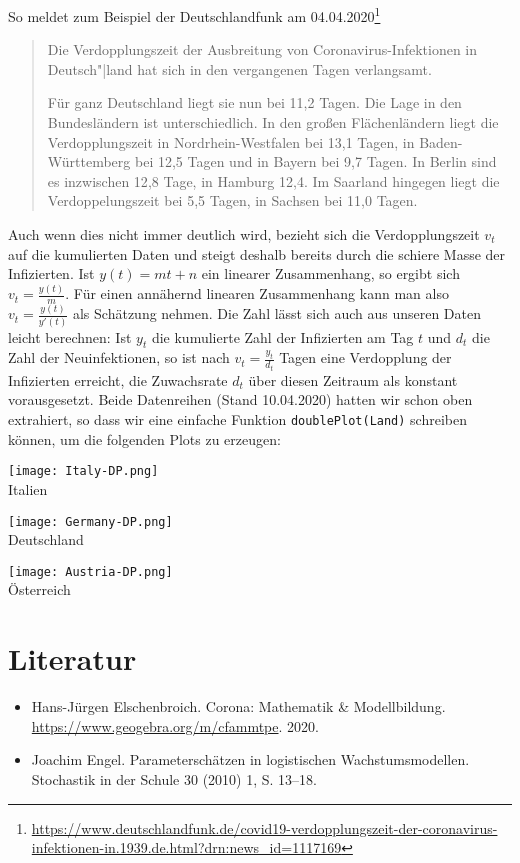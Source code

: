 \documentclass[a4paper,11pt]{article}
\begin{document}
So meldet zum Beispiel der Deutschlandfunk am 04.04.2020\footnote{\raggedright
  \url{https://www.deutschlandfunk.de/covid19-verdopplungszeit-der-coronavirus-infektionen-in.1939.de.html?drn:news_id=1117169}}
\begin{quote}
  Die Verdopplungszeit der Ausbreitung von Coronavirus-Infektionen in
  Deutsch"|land hat sich in den vergangenen Tagen verlangsamt.

  Für ganz Deutschland liegt sie nun bei 11{,}2 Tagen. Die Lage in den
  Bundesländern ist unterschiedlich. In den großen Flächenländern liegt die
  Verdopplungszeit in Nordrhein-Westfalen bei 13{,}1 Tagen, in
  Baden-Württemberg bei 12{,}5 Tagen und in Bayern bei 9{,}7 Tagen. In Berlin
  sind es inzwischen 12{,}8 Tage, in Hamburg 12{,}4. Im Saarland hingegen
  liegt die Verdoppelungszeit bei 5{,}5 Tagen, in Sachsen bei 11{,}0 Tagen.
\end{quote}
Auch wenn dies nicht immer deutlich wird, bezieht sich die Verdopplungszeit
$v_t$ auf die kumulierten Daten und steigt deshalb bereits durch die schiere
Masse der Infizierten.  Ist $y(t)=mt+n$ ein linearer Zusammenhang, so ergibt
sich $v_t=\frac{y(t)}{m}$. Für einen annähernd linearen Zusammenhang kann man
also $v_t=\frac{y(t)}{y'(t)}$ als Schätzung nehmen.  Die Zahl lässt sich auch
aus unseren Daten leicht berechnen: Ist $y_t$ die kumulierte Zahl der
Infizierten am Tag $t$ und $d_t$ die Zahl der Neuinfektionen, so ist nach
$v_t=\frac{y_t}{d_t}$ Tagen eine Verdopplung der Infizierten erreicht, die
Zuwachsrate $d_t$ über diesen Zeitraum als konstant vorausgesetzt.  Beide
Datenreihen (Stand 10.04.2020) hatten wir schon oben extrahiert, so dass wir
eine einfache Funktion \texttt{doublePlot(Land)} schreiben können, um die
folgenden Plots zu erzeugen:
\begin{center}  
  \begin{minipage}{.33\textwidth}\centering
    \texttt{[image: Italy-DP.png]}\\[1em] {Italien}
  \end{minipage}\hfill
  \begin{minipage}{.33\textwidth}\centering
    \texttt{[image: Germany-DP.png]}\\[1em] {Deutschland}
  \end{minipage}\hfill
  \begin{minipage}{.33\textwidth}\centering
    \texttt{[image: Austria-DP.png]}\\[1em] {Österreich}
  \end{minipage}
\end{center}


\section{Literatur}

\begin{itemize}
\item Hans-Jürgen Elschenbroich. Corona: Mathematik \& Modellbildung.\\
  \url{https://www.geogebra.org/m/cfammtpe}.  2020.
\item Joachim Engel. Parameterschätzen in logistischen Wachstumsmodellen.
  Stochastik in der Schule 30 (2010) 1, S. 13–18.
\end{itemize}
\end{document}
